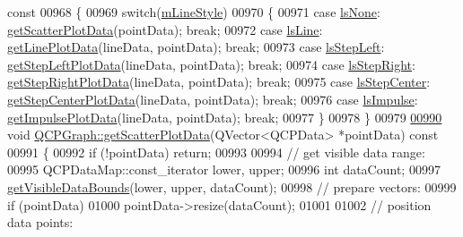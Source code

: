 \begin{DoxyCode}
{       const}
00968 \textcolor{keyword}{}\{
00969   \textcolor{keywordflow}{switch}(\hyperlink{a00031_a8604fd98402035a63375849f7341ee25}{mLineStyle})
00970   \{
00971     \textcolor{keywordflow}{case} \hyperlink{a00031_ad60175cd9b5cac937c5ee685c32c0859aea9591b933733cc7b20786b71e60fa04}{lsNone}: \hyperlink{a00031_a0899c4d6357aee19a3abff5897c3c8c5}{getScatterPlotData}(pointData); \textcolor{keywordflow}{break};
00972     \textcolor{keywordflow}{case} \hyperlink{a00031_ad60175cd9b5cac937c5ee685c32c0859a3c42a27b15aa3c92d399082fad8b7515}{lsLine}: \hyperlink{a00031_ac76804eb33446181f3e4f708b7639a75}{getLinePlotData}(lineData, pointData); \textcolor{keywordflow}{break};
00973     \textcolor{keywordflow}{case} \hyperlink{a00031_ad60175cd9b5cac937c5ee685c32c0859ae10568bda57836487d9dec5eba1d6c6e}{lsStepLeft}: \hyperlink{a00031_a6b7c14e04deed69b70d552dbe70c4d28}{getStepLeftPlotData}(lineData, pointData); \textcolor{keywordflow}{break};
00974     \textcolor{keywordflow}{case} \hyperlink{a00031_ad60175cd9b5cac937c5ee685c32c0859a9c37951f7d11aa070100fd16f2935c9e}{lsStepRight}: \hyperlink{a00031_ab2ad46716889c73ab977cf9280de0788}{getStepRightPlotData}(lineData, pointData); \textcolor{keywordflow}{break};
00975     \textcolor{keywordflow}{case} \hyperlink{a00031_ad60175cd9b5cac937c5ee685c32c0859a5adf7b04da215a40a764c21294ea7366}{lsStepCenter}: \hyperlink{a00031_ac79dc75dd98db9948d9656447b463af5}{getStepCenterPlotData}(lineData, pointData); \textcolor{keywordflow}{break};
00976     \textcolor{keywordflow}{case} \hyperlink{a00031_ad60175cd9b5cac937c5ee685c32c0859aa3b358b4ae7cca94aceeb8e529c12ebb}{lsImpulse}: \hyperlink{a00031_a0ff6e856387cc079b28592ead2a81f6c}{getImpulsePlotData}(lineData, pointData); \textcolor{keywordflow}{break};
00977   \}
00978 \}
00979 
\hypertarget{a00115_source_l00990}{}\hyperlink{a00031_a0899c4d6357aee19a3abff5897c3c8c5}{00990} \textcolor{keywordtype}{void} \hyperlink{a00031_a0899c4d6357aee19a3abff5897c3c8c5}{QCPGraph::getScatterPlotData}(QVector<QCPData> *pointData)\textcolor{keyword}{ const}
00991 \textcolor{keyword}{}\{
00992   \textcolor{keywordflow}{if} (!pointData) \textcolor{keywordflow}{return};
00993   
00994   \textcolor{comment}{// get visible data range:}
00995   QCPDataMap::const\_iterator lower, upper;
00996   \textcolor{keywordtype}{int} dataCount;
00997   \hyperlink{a00031_a8963c90087cf53b889b29dd59aa41aad}{getVisibleDataBounds}(lower, upper, dataCount);
00998   \textcolor{comment}{// prepare vectors:}
00999   \textcolor{keywordflow}{if} (pointData)
01000     pointData->resize(dataCount);
01001 
01002   \textcolor{comment}{// position data points:}

\end{DoxyCode}
